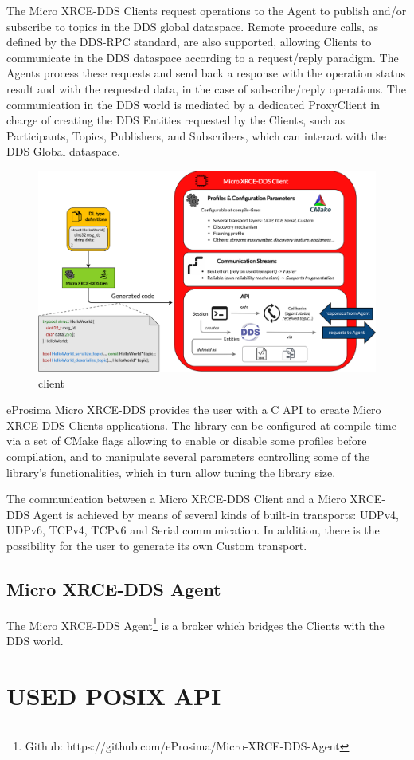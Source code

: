 The Micro XRCE-DDS Clients request operations to the Agent to publish and/or subscribe to topics in the DDS global dataspace. Remote procedure calls, as defined by the DDS-RPC standard, are also supported, allowing Clients to communicate in the DDS dataspace according to a request/reply paradigm. The Agents process these requests and send back a response with the operation status result and with the requested data, in the case of subscribe/reply operations. The communication in the DDS world is mediated by a dedicated ProxyClient in charge of creating the DDS Entities requested by the Clients, such as Participants, Topics, Publishers, and Subscribers, which can interact with the DDS Global dataspace.
\begin{figure}[htb!]
    \centering
    \includegraphics[width=0.95\linewidth]{Img/Client.png}
    \caption{client}\label{f:client}
    \vspace{-0.1in}
\end{figure}
eProsima Micro XRCE-DDS provides the user with a C API to create Micro XRCE-DDS Clients applications. The library can be configured at compile-time via a set of CMake flags allowing to enable or disable some profiles before compilation, and to manipulate several parameters controlling some of the library's functionalities, which in turn allow tuning the library size.

The communication between a Micro XRCE-DDS Client and a Micro XRCE-DDS Agent is achieved by means of several kinds of built-in transports: UDPv4, UDPv6, TCPv4, TCPv6 and Serial communication. In addition, there is the possibility for the user to generate its own Custom transport.

\subsection{Micro XRCE-DDS Agent} 
The Micro XRCE-DDS Agent\footnote{Github: https://github.com/eProsima/Micro-XRCE-DDS-Agent} is a broker which bridges the Clients with the DDS world.
\section{USED POSIX API}